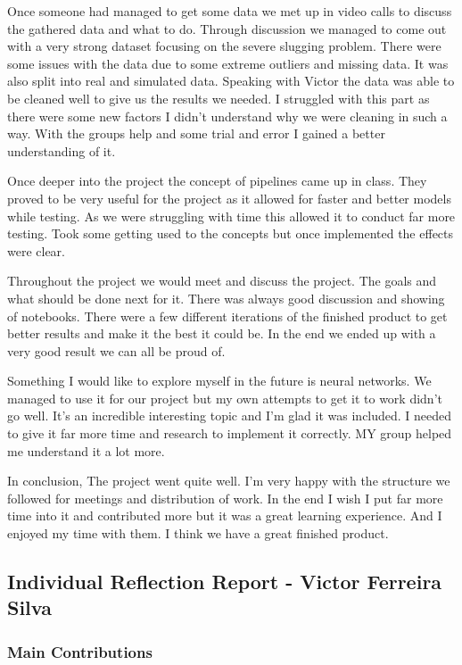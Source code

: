 \documentclass{article}
\begin{document}
Once someone had managed to get some data we met up in video calls to discuss the gathered data and what to do. Through discussion we managed to come out with a very strong dataset focusing on the severe slugging problem. There were some issues with the data due to some extreme outliers and missing data. It was also split into real and simulated data. Speaking with Victor the data was able to be cleaned well to give us the results we needed. I struggled with this part as there were some new factors I didn’t understand why we were cleaning in such a way. With the groups help and some trial and error I gained a better understanding of it.

Once deeper into the project the concept of pipelines came up in class. They proved to be very useful for the project as it allowed for faster and better models while testing. As we were struggling with time this allowed it to conduct far more testing. Took some getting used to the concepts but once implemented the effects were clear.

Throughout the project we would meet and discuss the project. The goals and what should be done next for it. There was always good discussion and showing of notebooks. There were a few different iterations of the finished product to get better results and make it the best it could be. In the end we ended up with a very good result we can all be proud of.

Something I would like to explore myself in the future is neural networks. We managed to use it for our project but my own attempts to get it to work didn’t go well. It’s an incredible interesting topic and I’m glad it was included. I needed to give it far more time and research to implement it correctly. MY group helped me understand it a lot more.

In conclusion, The project went quite well. I’m very happy with the structure we followed for meetings and distribution of work. In the end I wish I put far more time into it and contributed more but it was a great learning experience. And I enjoyed my time with them. I think we have a great finished product.

\subsection{Individual Reflection Report - Victor Ferreira Silva}

\subsubsection{Main Contributions}
\end{document}
